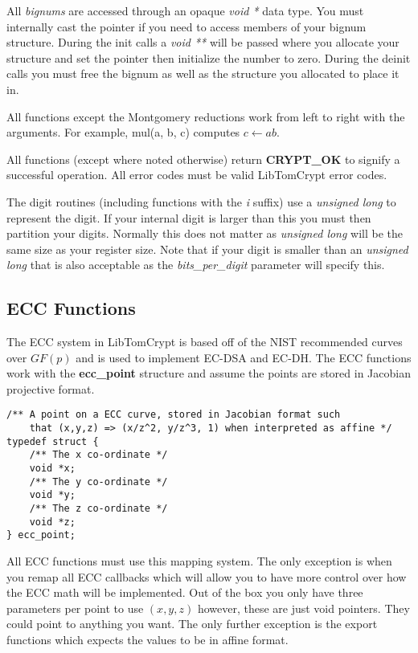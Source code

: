 \documentclass[synpaper]{book}
\begin{document}
All \textit{bignums} are accessed through an opaque \textit{void *} data type.  You must internally cast the pointer if you need to access members of your bignum structure.  During
the init calls a \textit{void **} will be passed where you allocate your structure and set the pointer then initialize the number to zero.  During the deinit calls you must
free the bignum as well as the structure you allocated to place it in.

All functions except the Montgomery reductions work from left to right with the arguments.  For example, mul(a, b, c) computes $c \leftarrow ab$.

All functions (except where noted otherwise) return \textbf{CRYPT\_OK} to signify a successful operation.  All error codes must be valid LibTomCrypt error codes.

The digit routines (including functions with the \textit{i} suffix) use a \textit{unsigned long} to represent the digit.  If your internal digit is larger than this you must
then partition your digits.  Normally this does not matter as \textit{unsigned long} will be the same size as your register size.  Note that if your digit is smaller
than an \textit{unsigned long} that is also acceptable as the \textit{bits\_per\_digit} parameter will specify this.

\subsection{ECC Functions}
The ECC system in LibTomCrypt is based off of the NIST recommended curves over $GF(p)$ and is used to implement EC-DSA and EC-DH.   The ECC functions work with
the \textbf{ecc\_point} structure and assume the points are stored in Jacobian projective format.

\begin{verbatim}
/** A point on a ECC curve, stored in Jacobian format such
    that (x,y,z) => (x/z^2, y/z^3, 1) when interpreted as affine */
typedef struct {
    /** The x co-ordinate */
    void *x;
    /** The y co-ordinate */
    void *y;
    /** The z co-ordinate */
    void *z;
} ecc_point;
\end{verbatim}

All ECC functions must use this mapping system.  The only exception is when you remap all ECC callbacks which will allow you to have more control
over how the ECC math will be implemented.  Out of the box you only have three parameters per point to use $(x, y, z)$ however, these are just void pointers.  They
could point to anything you want.  The only further exception is the export functions which expects the values to be in affine format.
\end{document}
